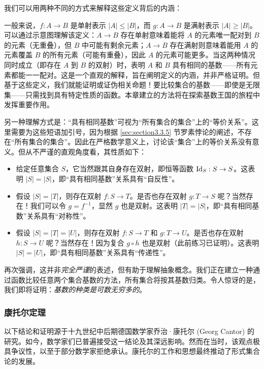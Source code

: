 我们可以用两种不同的方式来解释这些定义背后的内涵：

一般来说，$f : A \to B$ 是单射表示 $|A| \le |B|$，而 $g : A \to B$ 是满射表示 $|A| \ge |B|$。可以通过示意图理解该定义：$A \to B$ 存在单射意味着能将 $A$ 的元素唯一配对到 $B$ 的元素（无重叠），但 $B$ 中可能有剩余元素；$A \to B$ 存在满射则意味着能用 $A$ 的元素覆盖 $B$ 的所有元素（可能有重叠），因此 $A$ 的元素可能更多。当这两种情况同时成立（即存在 $A$ 到 $B$ 的双射）时，表明 $A$ 和 $B$ 具有相同的基数——所有元素都能一一配对。这是一个直观的解释，旨在阐明定义的内涵，并非严格证明。但基于这些定义，我们就能证明或证伪相关命题！要比较集合的基数——即使是无限集——只需找到具有特定性质的函数。本章建立的方法将在探索基数王国的旅程中发挥重要作用。

另一种理解方式是：``具有相同基数''可视为``所有集合的集合''上的``等价关系''。这里需要为这些短语加引号，因为根据 \ref{sec:section3.3.5} 节罗素悖论的阐述，不存在``所有集合的集合''。因此在严格数学意义上，讨论该``集合''上的等价关系没有意义。但从不严谨的直观角度看，其性质如下：

\begin{itemize}
    \item 给定任意集合 $S$，它当然跟其自身存在双射，即恒等函数 $\text{Id}_S : S \to S$。这表明 $|S|=|S|$，即``具有相同基数''关系具有``自反性''。
    \item 假设 $|S| = |T|$，则存在双射 $f:S \to T$。是否也存在双射 $g : T \to S$ 呢？当然存在！我们可以令 $g=f^{-1}$，显然 $g$ 也是双射。这表明 $|T| = |S|$，即``具有相同基数''关系具有``对称性''。
    \item 假设 $|S| = |T| = |U|$，则存在双射 $f : S \to T$ 和 $g : T \to U$。是否也存在双射 $h : S \to U$ 呢？当然存在！因为复合 $g \circ h$ 也是双射（此前练习已证明）。这表明 $|S| = |U|$，即``具有相同基数''关系具有``传递性''。
\end{itemize}

再次强调，这并非\emph{完全严谨}的表述，但有助于理解抽象概念。我们正在建立一种通过函数比较任意两个集合基数的方法，所有集合将按其基数归类。令人惊讶的是，我们即将证明：\emph{基数的种类是可数无穷多的}。

\subsubsection*{康托尔定理}

以下结论和证明源于十九世纪中后期德国数学家乔治·康托尔 (Georg Cantor) 的研究。如今，数学家们已普遍接受这一结论及其深远影响。然而在当时，该观点极具争议性，以至于部分数学家拒绝承认。康托尔的工作和思想最终推动了形式集合论的发展。

